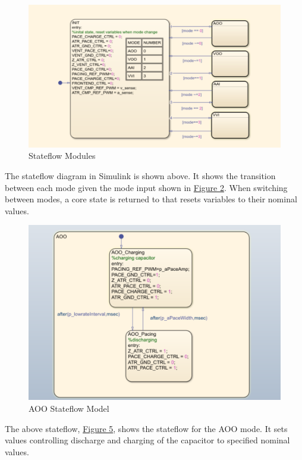 \documentclass{article}
\newcounter{subsubsubsection}[subsubsection]
\begin{document}
\newpage
{}
\begin{tcolorbox}
    \begin{figure}[H]\label{StateMod}
        \includegraphics[width=\textwidth]{StateMod.png}
        \caption{Stateflow Modules}   
    \end{figure}
\end{tcolorbox}
The stateflow diagram in Simulink is shown above. It shows the transition between each mode given the mode input shown in 
\hyperref[ConstIn]{Figure 2}. When switching between modes, a core state is returned to that resets variables to their nominal values. 

\newpage
{}
\begin{tcolorbox}
    \begin{figure}[H]\label{AOOSF}
        \includegraphics[width=\textwidth]{AOO.png}
        \caption{AOO Stateflow Model}     
    \end{figure}
\end{tcolorbox}
The above stateflow, \hyperref[AOOSF]{Figure 5}, shows the stateflow for the AOO mode. It sets values 
controlling discharge and charging of the capacitor to specified nominal values.
\end{document}
